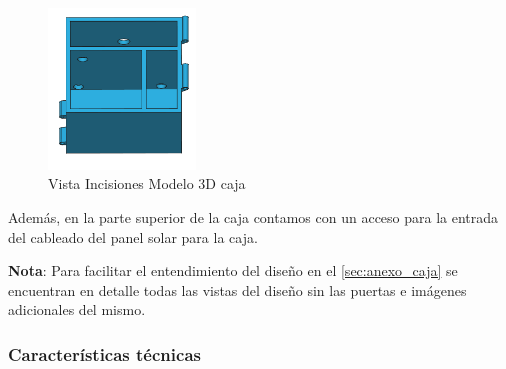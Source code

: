 \begin{figure}[H]
    \centering
    \includegraphics[width=0.35\textwidth]{images/4-DesarrolloTeorico/4-1-caja/CAJA_3D_ACCESOS.png}
    \caption{Vista Incisiones Modelo 3D caja}
    \label{fig:DesarrolloTeorico/Caja/CAJA_3D_ACCESOS}
\end{figure}


Además, en la parte superior de la caja contamos con un acceso para la entrada del cableado del panel solar para la caja.

\textbf{Nota}: Para facilitar el entendimiento del diseño en el \autoref{sec:anexo_caja} se encuentran en detalle todas las vistas del diseño sin las puertas e imágenes adicionales del mismo.

\subsubsection{Características técnicas}

